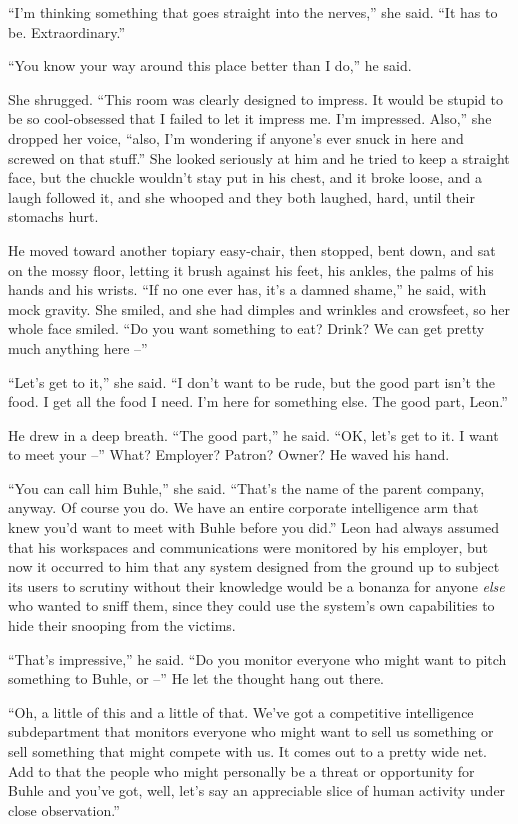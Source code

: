 “I'm thinking something that goes straight into the nerves,” she 
said. “It has to be. Extraordinary.”

“You know your way around this place better than I do,” he said.

She shrugged. “This room was clearly designed to impress. It would be 
stupid to be so cool-obsessed that I failed to let it impress me. I'm 
impressed. Also,” she dropped her voice, “also, I'm wondering if 
anyone's ever snuck in here and screwed on that stuff.” She looked 
seriously at him and he tried to keep a straight face, but the chuckle 
wouldn't stay put in his chest, and it broke loose, and a laugh 
followed it, and she whooped and they both laughed, hard, until their 
stomachs hurt.

He moved toward another topiary easy-chair, then stopped, bent down, 
and sat on the mossy floor, letting it brush against his feet, his 
ankles, the palms of his hands and his wrists. “If no one ever has, 
it's a damned shame,” he said, with mock gravity. She smiled, and she 
had dimples and wrinkles and crowsfeet, so her whole face smiled. “Do 
you want something to eat? Drink? We can get pretty much anything here 
--”

“Let's get to it,” she said. “I don't want to be rude, but the 
good part isn't the food. I get all the food I need. I'm here for 
something else. The good part, Leon.”

He drew in a deep breath. “The good part,” he said. “OK, let's 
get to it. I want to meet your --” What? Employer? Patron? Owner? He 
waved his hand.

“You can call him Buhle,” she said. “That's the name of the 
parent company, anyway. Of course you do. We have an entire corporate 
intelligence arm that knew you'd want to meet with Buhle before you 
did.” Leon had always assumed that his workspaces and communications 
were monitored by his employer, but now it occurred to him that any 
system designed from the ground up to subject its users to scrutiny 
without their knowledge would be a bonanza for anyone \emph{else} who 
wanted to sniff them, since they could use the system's own 
capabilities to hide their snooping from the victims.

“That's impressive,” he said. “Do you monitor everyone who might 
want to pitch something to Buhle, or --” He let the thought hang out 
there.

“Oh, a little of this and a little of that. We've got a competitive 
intelligence subdepartment that monitors everyone who might want to 
sell us something or sell something that might compete with us. It 
comes out to a pretty wide net. Add to that the people who might 
personally be a threat or opportunity for Buhle and you've got, well, 
let's say an appreciable slice of human activity under close 
observation.”

